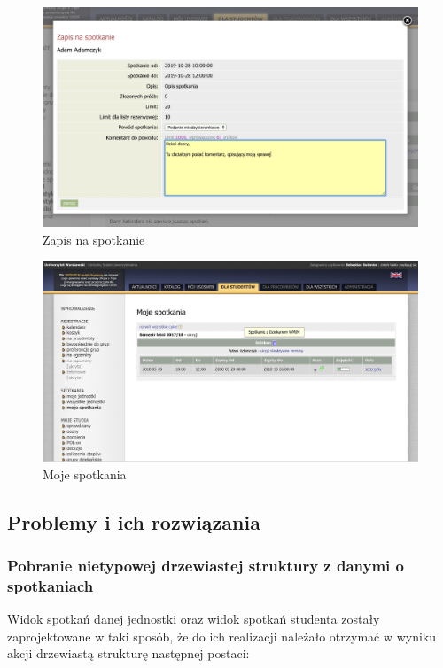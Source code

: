 \documentclass[licencjacka]{pracamgr}
\begin{document}
\begin{figure}[!]
  \includegraphics[width=\linewidth]{zapisUSOSweb.jpg}
  \caption{Zapis na spotkanie}
  \label{fig:zapisweb}
\end{figure}

\begin{figure}[!]
  \includegraphics[width=\linewidth]{mojeSpotkaniaUSOSweb.jpg}
  \caption{Moje spotkania}
  \label{fig:mojeweb}
\end{figure}

\newpage


\subsection{Problemy i ich rozwiązania}
\subsubsection{Pobranie nietypowej drzewiastej struktury z danymi o spotkaniach}
Widok spotkań danej jednostki oraz widok spotkań studenta zostały zaprojektowane w taki sposób, że do ich realizacji należało otrzymać w wyniku akcji drzewiastą strukturę następnej postaci:
\end{document}
